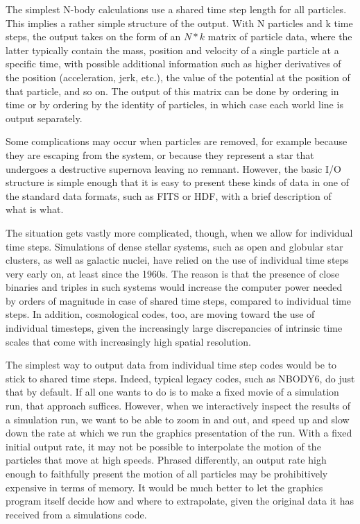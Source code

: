 \documentclass[5p,authoryear]{elsarticle}
\begin{document}
The simplest N-body calculations use a shared time step length for all
particles.  This implies a rather simple structure of the output.
With N particles and k time steps, the output takes on the form of an
$N*k$ matrix of particle data, where the latter typically contain the
mass, position and velocity of a single particle at a specific time,
with possible additional information such as higher derivatives of the
position (acceleration, jerk, etc.), the value of the potential at the
position of that particle, and so on.  The output of this matrix can
be done by ordering in time or by ordering by the identity of
particles, in which case each world line is output separately.

Some complications may occur when particles are removed, for example
because they are escaping from the system, or because they represent a
star that undergoes a destructive supernova leaving no remnant.
However, the basic I/O structure is simple enough that it is easy to
present these kinds of data in one of the standard data formats, such
as FITS or HDF, with a brief description of what is what.

The situation gets vastly more complicated, though, when we allow for
individual time steps.  Simulations of dense stellar systems, such as
open and globular star clusters, as well as galactic nuclei, have
relied on the use of individual time steps very early on, at least
since the 1960s.  The reason is that the presence of close binaries
and triples in such systems would increase the computer power needed
by orders of magnitude in case of shared time steps, compared to
individual time steps.  In addition, cosmological codes, too, are
moving toward the use of individual timesteps, given the increasingly
large discrepancies of intrinsic time scales that come with
increasingly high spatial resolution.

The simplest way to output data from individual time step codes would
be to stick to shared time steps.  Indeed, typical legacy codes, such
as NBODY6, do just that by default.  If all one wants to do is to make
a fixed movie of a simulation run, that approach suffices.  However,
when we interactively inspect the results of a simulation run, we want
to be able to zoom in and out, and speed up and slow down the rate at
which we run the graphics presentation of the run.  With a fixed
initial output rate, it may not be possible to interpolate the motion
of the particles that move at high speeds.  Phrased differently, an
output rate high enough to faithfully present the motion of all
particles may be prohibitively expensive in terms of memory.  It would
be much better to let the graphics program itself decide how and where
to extrapolate, given the original data it has received from a
simulations code.
\end{document}
